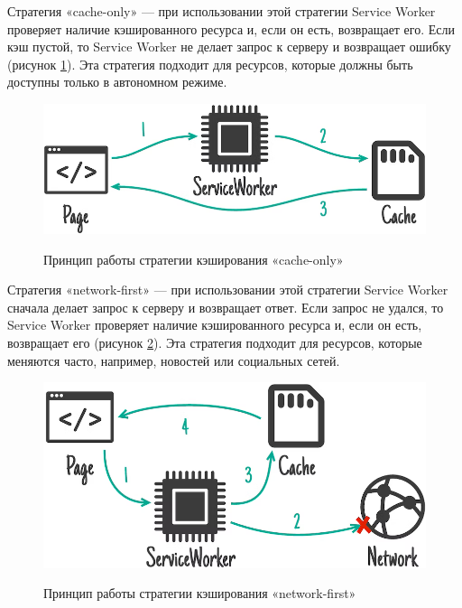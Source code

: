 Стратегия «cache-only» — при использовании этой стратегии Service Worker проверяет наличие кэшированного ресурса и, если он есть, возвращает его. Если кэш пустой, то Service Worker не делает запрос к серверу и возвращает ошибку (рисунок \ref{fig:cache-only}). Эта стратегия подходит для ресурсов, которые должны быть доступны только в автономном режиме.

\begin{figure}[H]
\begin{center}
\includegraphics[width=1.0\hsize]{fig/cache-only.png}\\[2mm]
\caption{Принцип работы стратегии кэширования «cache-only»}\label{fig:cache-only}
\end{center}
\end{figure}

Стратегия «network-first» — при использовании этой стратегии Service Worker сначала делает запрос к серверу и возвращает ответ. Если запрос не удался, то Service Worker проверяет наличие кэшированного ресурса и, если он есть, возвращает его (рисунок \ref{fig:network-first}). Эта стратегия подходит для ресурсов, которые меняются часто, например, новостей или социальных сетей.

\begin{figure}[H]
\begin{center}
\includegraphics[width=1.0\hsize]{fig/net-first.png}\\[2mm]
\caption{Принцип работы стратегии кэширования «network-first»}\label{fig:network-first}
\end{center}
\end{figure}

